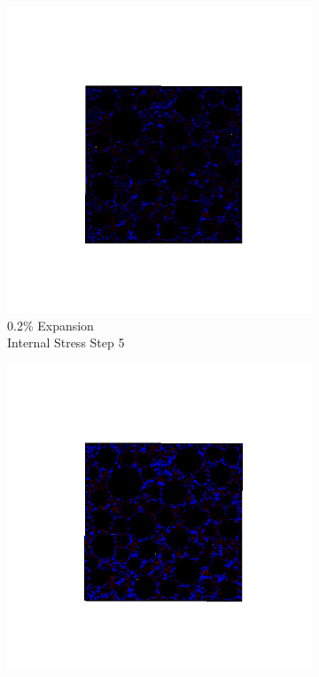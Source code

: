 \begin{figure}[ht!]
\centering
    \begin{subfigure}{.25\textwidth}
      \centering
      \includegraphics[width=1.0\linewidth]{Files/exp_3D/DEF/A30X-1C_1_s5.png}
      \caption{0.2\% Expansion\\Internal Stress Step 5}
    \end{subfigure}%
    \begin{subfigure}{.25\textwidth}
      \centering
      \includegraphics[width=1.0\linewidth]{Files/exp_3D/DEF/A30X-1C_1_s10.png}

\end{subfigure}
\end{figure}
